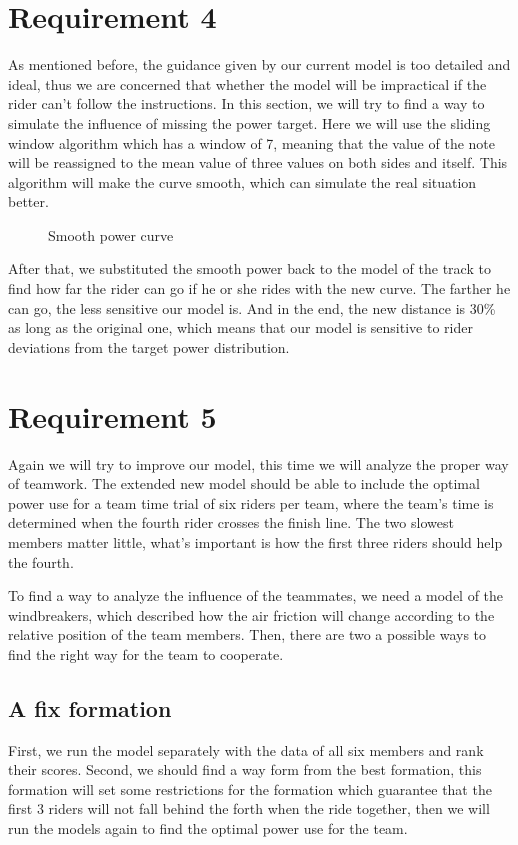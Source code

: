 \documentclass[12pt]{article}
\begin{document}
\section{Requirement 4}
As mentioned before, the guidance given by our current model is too detailed and ideal, thus we are concerned that whether the model will be impractical if the rider can't
follow the instructions. In this section, we will try to find a way to simulate the influence of missing the power target. Here we will use the sliding window algorithm which
has a window of 7, meaning that the value of the note will be reassigned to the mean value of three values on both sides and itself. This algorithm will make the curve smooth,
which can simulate the real situation better.
\begin{figure}
    \centering
    
    \caption{Smooth power curve}
\end{figure}

After that, we substituted the smooth power back to the model of the track to find how far the rider can go if he or she rides with the new curve. The farther he can go, the
less sensitive our model is. And in the end, the new distance is 30\% as long as the original one, which means that our model is sensitive to rider deviations from the target power
distribution.
\section{Requirement 5}
Again we will try to improve our model, this time we will analyze the proper way of teamwork. The extended new model should be able to include the optimal power use for a team time trial of six riders per team, where the team's time is
determined when the fourth rider crosses the finish line. The two slowest members matter little, what's important is how the first three riders should help the fourth.

To find a way to analyze the influence of the teammates, we need a model of the windbreakers, which described how the air friction will change according to the relative
position of the team members. Then, there are two a possible ways to find the right way for the team to cooperate.
\subsection{A fix formation}
First, we run the model separately with the data of all six members and rank their scores. Second, we should find a way form from the best formation, this formation will
set some restrictions for the formation which guarantee that the first 3 riders will not fall behind the forth when the ride together, then we will run the models again to
find the optimal power use for the team.
\end{document}
